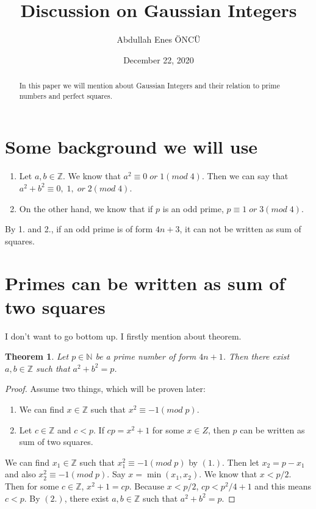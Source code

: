 \documentclass{article}
\title{Discussion on Gaussian Integers}
\author{Abdullah Enes ÖNCÜ}
\date{December 22, 2020}
\begin{document}
\maketitle



\newtheorem{theorem}{Theorem}
\newtheorem{lemma}{Lemma}


\begin{abstract}
    In this paper we will mention about Gaussian Integers and their relation to prime numbers and perfect squares.
\end{abstract}

\section{Some background we will use}

\begin{enumerate}
\item Let $a,b \in \mathbb{Z}.$ We know that $a^2 \equiv 0 \; or \; 1 (mod\; 4)$. Then we can say that $a^2+b^2 \equiv 0, \; 1, \; or \; 2(mod\; 4)$.
\item On the other hand, we know that if $p$ is an odd prime, $p \equiv 1 \; or \; 3(mod\;4)$.
\end{enumerate}
By 1. and 2., if an odd prime is of form $4n+3$, it can not be written as sum of squares.

\section{Primes can be written as sum of two squares}

I don't want to go bottom up. I firstly mention about theorem.

\begin{theorem}
Let $p \in \mathbb{N}$ be a prime number of form $4n+1$. Then there exist $a,b\in \mathbb{Z}$ such that $a^2+b^2=p$.
\end{theorem}

\begin{proof}
Assume two things, which will be proven later:
\begin{enumerate}
    \item We can find $x\in \mathbb{Z}$ such that $x^2\equiv-1(mod\; p)$.
    \item Let $c\in\mathbb{Z}$ and $c<p$. If $cp=x^2+1$ for some $x\in{Z}$, then $p$ can be written as sum of two squares.
\end{enumerate}
\: We can find $x_1\in\mathbb{Z}$ such that $x_1^2\equiv-1(mod\; p)$ by $(1.)$. Then let $x_2=p-x_1$ and also $x_2^2\equiv-1(mod\; p)$. Say $x=\min(x_1, x_2)$. We know that $x<p/2$. 
Then for some $c\in\mathbb{Z}$, $x^2+1=cp$. Because $x<p/2$, $cp < p^2/4+1$ and this means $c<p$.
By $(2.)$, there exist $a,b\in \mathbb{Z}$ such that $a^2+b^2=p$.
\end{proof}
\end{document}
